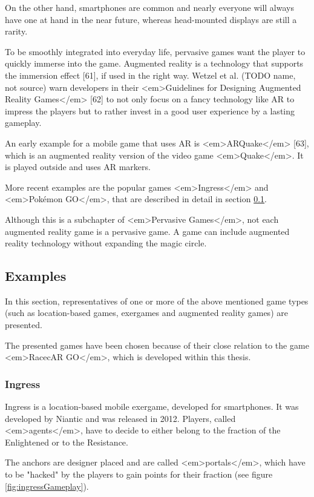 On the other hand, smartphones are common and nearly everyone will always have one at hand in the near future, whereas head-mounted displays are still a rarity.

To be smoothly integrated into everyday life, pervasive games want the player to quickly immerse into the game. Augmented reality is a technology that supports the immersion effect [61], if used in the right way. Wetzel et al. (TODO name, not source) warn developers in their <em>Guidelines for Designing Augmented Reality Games</em> [62] to not only focus on a fancy technology like AR to impress the players but to rather invest in a good user experience by a lasting gameplay.

An early example for a mobile game that uses AR is <em>ARQuake</em> [63], which is an augmented reality version of the video game <em>Quake</em>. It is played outside and uses AR markers.

More recent examples are the popular games <em>Ingress</em> and <em>Pokémon GO</em>, that are described in detail in section \ref{sec:examples}.

Although this is a subchapter of <em>Pervasive Games</em>, not each augmented reality game is a pervasive game. A game can include augmented reality technology without expanding the magic circle.

\subsection{Examples}\label{sec:examples}
In this section, representatives of one or more of the above mentioned game types (such as location-based games, exergames and augmented reality games) are presented.

The presented games have been chosen because of their close relation to the game <em>RacecAR GO</em>, which is developed within this thesis.

\subsubsection{Ingress}
Ingress is a location-based mobile exergame, developed for smartphones. It was developed by Niantic and was released in 2012. Players, called <em>agents</em>, have to decide to either belong to the fraction of the Enlightened or to the Resistance.

The anchors are designer placed and are called <em>portals</em>, which have to be "hacked" by the players to gain points for their fraction (see figure \ref{fig:ingressGameplay}).


